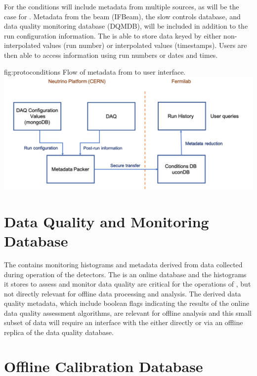 \documentclass[../main-v1.tex]{subfiles}
\begin{document}
For  the conditions  will include metadata from multiple sources, as will be the case for . Metadata from the beam  (IFBeam), the slow controls database, and data quality monitoring database (DQMDB), will be included in addition to the run configuration information. The  is able to store data keyed by either non-interpolated values (run number) or interpolated values (timestamps). Users are then able to access information using run numbers or dates and times.

\begin{dunefigure}
{fig:protoconditions} 
{Flow of metadata from   to user interface.}
\includegraphics[width=.9\columnwidth]{graphics/Databases/Conditions_ProtoDUNE.png}
\end{dunefigure}

\section{Data Quality and Monitoring Database  }
\label{sec:db:dqm}  

The  contains monitoring histograms and metadata derived from data collected during operation of the  detectors. The  is an online database and the histograms it stores to assess and monitor data quality are critical for the operations of , but not directly relevant for offline data processing and analysis. The derived data quality metadata, which include boolean flags indicating the results of the online data quality assessment algorithms, are relevant for offline analysis and this small subset of  data will require an interface with the  either directly or via an offline replica of the data quality database.

\section{Offline Calibration Database  }
\label{sec:db:calib} 
\end{document}

